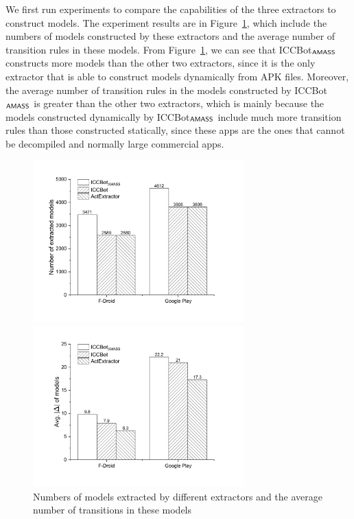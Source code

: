 We first run experiments to compare the capabilities of the three extractors to construct {\AMASS} models. The experiment results are in Figure~\ref{fig:cmp-extractor-model}, which include the numbers of models constructed by these extractors and the average number of transition rules in these models. From Figure~\ref{fig:cmp-extractor-model}, we can see that ICCBot$_{\textsf{AMASS}}$ constructs more models than the other two extractors, since it is the only extractor that is able to construct models dynamically from APK files. Moreover, the average number of transition rules in the models constructed by ICCBot$_{\textsf{AMASS}}$ is greater than the other two extractors, which is mainly because the models constructed dynamically by ICCBot$_{\textsf{AMASS}}$ include much more transition rules than those constructed statically, since these apps are the ones that cannot be decompiled and normally large %
commercial apps. 

\begin{figure}[htbp]
	\begin{minipage}[t]{0.49\linewidth}
		\centering
		\includegraphics[width=3.2in]{model.pdf}
	\end{minipage}
	\begin{minipage}[t]{0.49\linewidth}
		\centering
		\includegraphics[width=3.2in]{delta.pdf}
	\end{minipage}
	\caption{Numbers of models extracted by different extractors and the average number of transitions in these models}
	\label{fig:cmp-extractor-model}
\end{figure}

